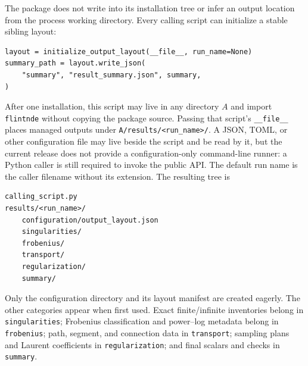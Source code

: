 \documentclass[11pt]{article}
\begin{document}
The package does not write into its installation tree or infer an output location from the
process working directory.  Every calling script can initialize a stable sibling layout:
\begin{verbatim}
layout = initialize_output_layout(__file__, run_name=None)
summary_path = layout.write_json(
    "summary", "result_summary.json", summary,
)
\end{verbatim}
After one installation, this script may live in any directory $A$ and import
\texttt{flintnde} without copying the package source.  Passing that script's
\texttt{\_\_file\_\_} places managed outputs under
\texttt{A/results/<run\_name>/}.  A JSON, TOML, or other configuration file may live beside
the script and be read by it, but the current release does not provide a configuration-only
command-line runner: a Python caller is still required to invoke the public API.
The default run name is the caller filename without its extension.  The resulting tree is
\begin{verbatim}
calling_script.py
results/<run_name>/
    configuration/output_layout.json
    singularities/
    frobenius/
    transport/
    regularization/
    summary/
\end{verbatim}
Only the configuration directory and its layout manifest are created eagerly.  The other
categories appear when first used.  Exact finite/infinite inventories belong in
\texttt{singularities}; Frobenius classification and power--log metadata belong in
\texttt{frobenius}; path, segment, and connection data in \texttt{transport}; sampling
plans and Laurent coefficients in \texttt{regularization}; and final scalars and checks in
\texttt{summary}.
\end{document}
